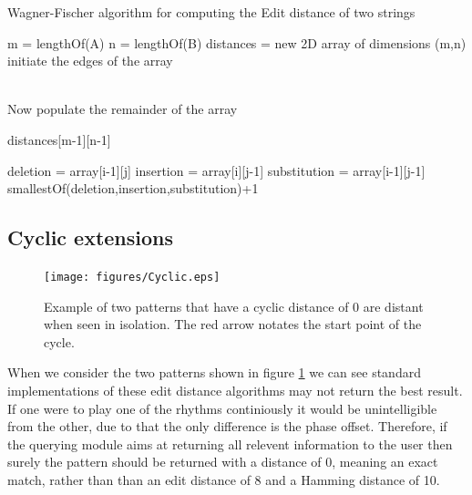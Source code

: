 \documentclass[12pt,twoside,notitlepage]{report}
\begin{document}
	
		
		\begin{algorithm}
				\caption{Wagner-Fischer algorithm for computing the Edit distance of two strings}
				\label{algo:WagnerFischer}
				\begin{algorithmic}[1]
						\State m = lengthOf(A)
						\State n = lengthOf(B)
						\State distances = new 2D array of dimensions (m,n)		
						\State \\initiate the edges of the array
							
						\EndFor
						\EndFor
						
						\State \\Now populate the remainder of the array
								\Else
									
								\EndIf
							\EndFor
						\EndFor
						
						\State \Return distances[m-1][n-1]


					\EndProcedure
						\State deletion = array[i-1][j]
						\State insertion = array[i][j-1]
						\State substitution = array[i-1][j-1]
						\State \Return smallestOf(deletion,insertion,substitution)+1
					\EndProcedure
				\end{algorithmic}
				\end{algorithm}
		
		
		\subsection{Cyclic extensions}\label{subsec:Cyclic extensions}
		\begin{figure}[h]
			\centerline{\texttt{[image: figures/Cyclic.eps]}}
			\caption{\label{fig:cyclic example} Example of two patterns that have a cyclic distance of 0 are distant when seen in isolation. The red arrow notates the start point of the cycle.}
\end{figure}	
		When we consider the two patterns shown in figure \ref{fig:cyclic example} we can see standard implementations of these edit distance algorithms may not return the best result. If one were to play one of the rhythms continiously it would be unintelligible from the other, due to that the only difference is the phase offset. Therefore, if the querying module aims at returning all relevent information to the user then surely the pattern should be returned with a distance of 0, meaning an exact match, rather than than an edit distance of 8 and a Hamming distance of 10.
		
\end{document}
